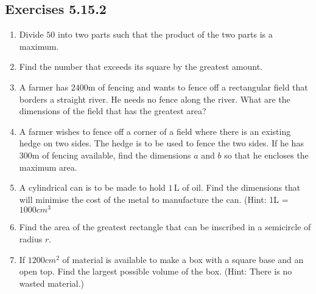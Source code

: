 \subsection{Exercises 5.15.2}
\begin{enumerate}
\item Divide $50$ into two parts such that the product of the two parts is a maximum. 

\item Find
the number that exceeds its square by the greatest amount. 

\item A farmer has $2400 \mbox{m}$ of fencing and wants to fence off a rectangular field that borders a straight
river. He needs no fence along the river. What are the dimensions
of the field that has the greatest area? 

\item A farmer wishes to fence off a corner of a field where
there is an existing hedge on two sides. The hedge is to be used to fence the two sides. If
he has $300 \mbox{m}$ of fencing available, find the dimensions $a$ and $b$ so that he encloses the maximum area. \\\relax    
\setlength\fboxrule{0in}\setlength\fboxsep{0.2in}


\item A cylindrical can is to be made to hold $1\,$L of oil. Find the dimensions that will minimise the cost of the
metal to manufacture the can. (Hint: 1\thinspace L = $1000 cm^{3}$ 

\item Find the area of the greatest rectangle that can be inscribed in a semicircle
of radius $r$. 

\item If $1200 cm^{2}$ of material is available to make a box with a square base and an open top. Find the largest
possible volume of the box. (Hint: There is no wasted material.) \end{enumerate}


